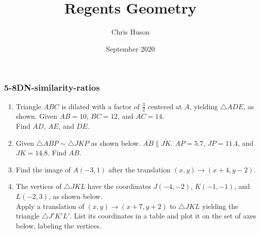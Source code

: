 \documentclass[12pt, twoside]{article}
\title{Regents Geometry}
\author{Chris Huson}
\date{September 2020}
\begin{document}
\subsubsection*{5-8DN-similarity-ratios}
\begin{enumerate}
\item Triangle $ABC$ is dilated with a factor of $\frac{3}{2}$ centered at $A$, yielding $\triangle ADE$, as shown. Given $AB=10$, $BC=12$, and $AC=14$. \\[0.25cm] Find $AD$, $AE$, and $DE$.
    \begin{flushright}
      \end{flushright}

   \vspace{2cm}

\item Given $\triangle ABP \sim \triangle JKP$ as shown below. $\overline{AB} \parallel \overline{JK}$. $AP=5.7$, $JP=11.4$, and $JK=14.8$. Find $AB$.
    \begin{flushright}
       \end{flushright}
       \vspace{2cm}

\item Find the image of $A(-3,1)$ after the translation $(x,y) \rightarrow (x+4,y-2)$.
  
\newpage
\item The vertices of $\triangle JKL$ have the coordinates $J(-4,-2)$, $K(-1,-1)$, and $L(-2,3)$, as shown below. \\[0.5cm]
    Apply a translation of $(x,y) \rightarrow (x+7, y+2)$ to $\triangle JKL$  yielding the triangle $\triangle J'K'L'$. List its coordinates in a table and plot it on the set of axes below, labeling the vertices.
    \begin{flushright}
\end{flushright}
\end{enumerate}
\end{document}

